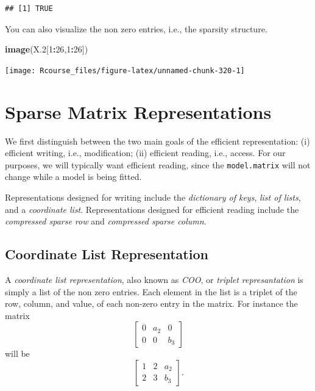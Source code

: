 \documentclass[]{book}
\newenvironment{Shaded}{\begin{snugshade}}{\end{snugshade}}
\newcommand{\DataTypeTok}[1]{\textcolor[rgb]{0.13,0.29,0.53}{#1}}
\newcommand{\DecValTok}[1]{\textcolor[rgb]{0.00,0.00,0.81}{#1}}
\newcommand{\FloatTok}[1]{\textcolor[rgb]{0.00,0.00,0.81}{#1}}
\newcommand{\KeywordTok}[1]{\textcolor[rgb]{0.13,0.29,0.53}{\textbf{#1}}}
\newcommand{\NormalTok}[1]{#1}
\newcommand{\OperatorTok}[1]{\textcolor[rgb]{0.81,0.36,0.00}{\textbf{#1}}}
\theoremstyle{definition}
\theoremstyle{definition}
\theoremstyle{definition}
\theoremstyle{remark}
\begin{document}
\begin{Shaded}
\end{Shaded}

\begin{verbatim}
## [1] TRUE
\end{verbatim}

You can also visualize the non zero entries, i.e., the sparsity structure.

\begin{Shaded}
\begin{Highlighting}[]
\KeywordTok{image}\NormalTok{(X}\FloatTok{.2}\NormalTok{[}\DecValTok{1}\OperatorTok{:}\DecValTok{26}\NormalTok{,}\DecValTok{1}\OperatorTok{:}\DecValTok{26}\NormalTok{])}
\end{Highlighting}
\end{Shaded}

\texttt{[image: Rcourse\_files/figure-latex/unnamed-chunk-320-1]}

\hypertarget{sparse-matrix-representations}{%
\section{Sparse Matrix Representations}\label{sparse-matrix-representations}}

We first distinguish between the two main goals of the efficient representation:
(i) efficient writing, i.e., modification;
(ii) efficient reading, i.e., access.
For our purposes, we will typically want efficient reading, since the \texttt{model.matrix} will not change while a model is being fitted.

Representations designed for writing include the \emph{dictionary of keys}, \emph{list of lists}, and a \emph{coordinate list}.
Representations designed for efficient reading include the \emph{compressed sparse row} and \emph{compressed sparse column}.

\hypertarget{coo}{%
\subsection{Coordinate List Representation}\label{coo}}

A \emph{coordinate list representation}, also known as \emph{COO}, or \emph{triplet represantation} is simply a list of the non zero entries.
Each element in the list is a triplet of the row, column, and value, of each non-zero entry in the matrix.
For instance the matrix
\[ \begin{bmatrix}
0 & a_2 & 0 \\
0 & 0 & b_3 
\end{bmatrix}  \]
will be
\[ \begin{bmatrix}
1 & 2 & a_2 \\
2 & 3 & b_3 
\end{bmatrix}.  \]
\end{document}
